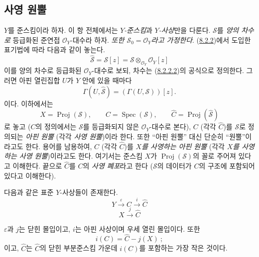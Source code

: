\subsection{사영 원뿔}
\label{subsection:II.8.3-ko}

\begin{env}[8.3.1]
\label{II.8.3.1-ko}
$Y$를 준스킴이라 하자. 이 항 전체에서는 \emph{$Y$-준스킴}과
\emph{$Y$-사상}만을 다룬다. $\mathcal{S}$를 \emph{양의 차수로} 등급화된 준연접
$\mathcal{O}_Y$-대수라 하자. \emph{또한 $\mathcal{S}_0=\mathcal{O}_Y$라고
가정한다}. (\hyperref[II.8.2.2-ko]{8.2.2})에서 도입한 표기법에 따라
다음과 같이 놓는다.
\begin{equation}
\label{II.8.3.1.1-ko}
  \widehat{\mathcal{S}}=\mathcal{S}[z]
  =\mathcal{S}\otimes_{\mathcal{O}_Y}\mathcal{O}_Y[z]
\tag{8.3.1.1}
\end{equation}
이를 양의 차수로 등급화된 $\mathcal{O}_Y$-대수로 보되, 차수는
(\hyperref[II.8.2.2.2-ko]{8.2.2.2})의 공식으로 정의한다. 그러면 아핀
열린집합 $U$가 $Y$ 안에 있을 때마다
\[
  \Gamma(U,\widehat{\mathcal{S}})=(\Gamma(U,\mathcal{S}))[z].
\]
이다. 이하에서는
\begin{equation}
\label{II.8.3.1.2-ko}
  X=\operatorname{Proj}(\mathcal{S}),\qquad
  C=\operatorname{Spec}(\mathcal{S}),\qquad
  \widehat{C}=\operatorname{Proj}(\widehat{\mathcal{S}})
\tag{8.3.1.2}
\end{equation}
로 놓고 ($C$의 정의에서는 $\mathcal{S}$를 등급화되지 않은
$\mathcal{O}_Y$-대수로 본다), $C$ (각각 $\widehat{C}$)를
$\mathcal{S}$로 정의되는 \emph{아핀 원뿔} (각각 \emph{사영 원뿔})이라 한다.
또한 “아핀 원뿔” 대신 단순히 “원뿔”이라고도 한다. 용어를
남용하여, $C$ (각각 $\widehat{C}$)를 \emph{$X$를 사영하는 아핀 원뿔}
(각각 \emph{$X$를 사영하는 사영 원뿔})이라고도 한다. 여기서는 준스킴
$X$가 $\operatorname{Proj}(\mathcal{S})$의 꼴로 주어져 있다고 이해한다.
끝으로 $\widehat{C}$를 $C$의 \emph{사영 폐포}라고 한다
($\mathcal{S}$의 데이터가 $C$의 구조에 포함되어 있다고 이해한다).
\end{env}

\begin{proposition}[8.3.2]
\label{II.8.3.2-ko}
다음과 같은 표준 $Y$-사상들이 존재한다.
\begin{equation}
\label{II.8.3.2.1-ko}
  Y\xrightarrow{\varepsilon}C\xrightarrow{i}\widehat{C}
\tag{8.3.2.1}
\end{equation}
\begin{equation}
\label{II.8.3.2.2-ko}
  X\xrightarrow{j}\widehat{C}
\tag{8.3.2.2}
\end{equation}

$\varepsilon$과 $j$는 닫힌 몰입이고, $i$는 아핀 사상이며 우세 열린
몰입이다. 또한
\begin{equation}
\label{II.8.3.2.3-ko}
  i(C)=\widehat{C}-j(X)~;
\tag{8.3.2.3}
\end{equation}
이고, $\widehat{C}$는 $\widehat{C}$의 닫힌 부분준스킴 가운데
$i(C)$를 포함하는 가장 작은 것이다.
\end{proposition}

